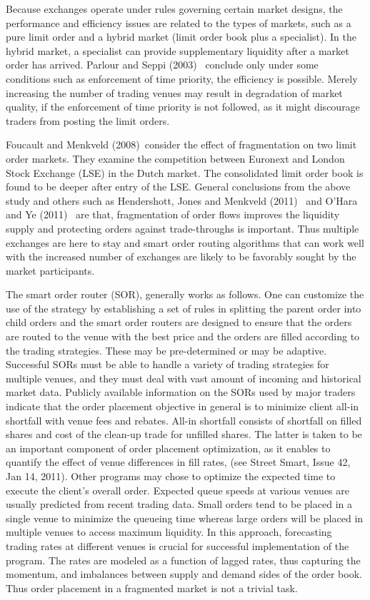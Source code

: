 Because exchanges operate under rules governing certain market designs, the performance and efficiency issues are related to the types of markets, such as a pure limit order and a hybrid market (limit order book plus a specialist). In the hybrid market, a specialist can provide supplementary liquidity after a market order has arrived. Parlour and Seppi (2003)~\cite{parlour2003} conclude only under some conditions such as enforcement of time priority, the efficiency is possible. Merely increasing the number of trading venues may result in degradation of market quality, if the enforcement of time priority is not followed, as it might discourage traders from posting the limit orders.


Foucault and Menkveld (2008)~\cite{foumen}consider the effect of fragmentation on two limit order markets. They examine the competition between Euronext and London Stock Exchange (LSE) in the Dutch market. The consolidated limit order book is found to be deeper after entry of the LSE. General conclusions from the above study and others such as Hendershott, Jones and Menkveld (2011)~\cite{hjm} and O'Hara and Ye (2011)~\cite{oye} are that, fragmentation of order flows improves the liquidity supply and protecting orders against trade-throughs is important. Thus multiple exchanges are here to stay and smart order routing algorithms that can work well with the increased number of exchanges are likely to be favorably sought by the market participants.


The smart order router (SOR),\label{in:sor3} generally works as follows. One can customize the use of the strategy by establishing a set of rules in splitting the parent order into child orders and the smart order routers are designed to ensure that the orders are routed to the venue with the best price and the orders are filled according to the trading strategies. These may be pre-determined or may be adaptive. Successful SORs must be able to handle a variety of trading strategies for multiple venues, and they must deal with vast amount of incoming and historical market data. Publicly available information on the SORs used by major traders indicate that the order placement objective in general is to minimize client all-in shortfall with venue fees and rebates. All-in shortfall consists of shortfall on filled shares and cost of the clean-up trade for unfilled shares. The latter is taken to be an important component of order placement optimization, as it enables to quantify the effect of venue differences in fill rates, (see Street Smart, Issue 42, Jan 14, 2011). Other programs may chose to optimize the expected time to execute the client's overall order. Expected queue speeds at various venues are usually predicted from recent trading data. Small orders tend to be placed in a single venue to minimize the queueing time whereas large orders will be placed in multiple venues to access maximum liquidity. In this approach, forecasting trading rates at different venues is crucial for successful implementation of the program. The rates are modeled as a function of lagged rates, thus capturing the momentum, and imbalances between supply and demand sides of the order book. Thus order placement in a fragmented market is not a trivial task.


